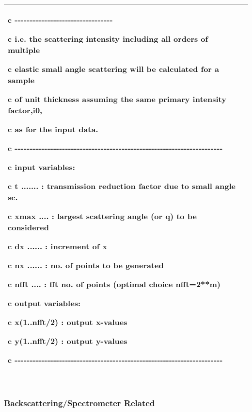 \documentclass[]{article}
\begin{document}
\begin{longtable}[]{@{}ll@{}}
\begin{minipage}[t]{0.47\columnwidth}
c
-\/-\/-\/-\/-\/-\/-\/-\/-\/-\/-\/-\/-\/-\/-\/-\/-\/-\/-\/-\/-\/-\/-\/-\/-\/-\/-\/-\/-\/-\/-\/-\/-

c i.e. the scattering intensity including all orders of multiple

c elastic small angle scattering will be calculated for a sample

c of unit thickness assuming the same primary intensity factor,i0,

c as for the input data.

c
-\/-\/-\/-\/-\/-\/-\/-\/-\/-\/-\/-\/-\/-\/-\/-\/-\/-\/-\/-\/-\/-\/-\/-\/-\/-\/-\/-\/-\/-\/-\/-\/-\/-\/-\/-\/-\/-\/-\/-\/-\/-\/-\/-\/-\/-\/-\/-\/-\/-\/-\/-\/-\/-\/-\/-\/-\/-\/-\/-\/-\/-\/-\/-\/-\/-\/-\/-\/-\/-

c input variables:

c t ....... : transmission reduction factor due to small angle sc.

c xmax .... : largest scattering angle (or q) to be considered

c dx ...... : increment of x

c nx ...... : no. of points to be generated

c nfft .... : fft no. of points (optimal choice nfft=2**m)

c output variables:

c x(1..nfft/2) : output x-values

c y(1..nfft/2) : output y-values

c
-\/-\/-\/-\/-\/-\/-\/-\/-\/-\/-\/-\/-\/-\/-\/-\/-\/-\/-\/-\/-\/-\/-\/-\/-\/-\/-\/-\/-\/-\/-\/-\/-\/-\/-\/-\/-\/-\/-\/-\/-\/-\/-\/-\/-\/-\/-\/-\/-\/-\/-\/-\/-\/-\/-\/-\/-\/-\/-\/-\/-\/-\/-\/-\/-\/-\/-\/-\/-\/-\strut
\end{minipage}\tabularnewline
\bottomrule
\end{longtable}

\hypertarget{section-5}{%
\subsubsection{}\label{section-5}}

\hypertarget{section-6}{%
\subsubsection{}\label{section-6}}

\hypertarget{backscatteringspectrometer-related}{%
\subsubsection{\texorpdfstring{\\
Backscattering/Spectrometer
Related}{ Backscattering/Spectrometer Related}}\label{backscatteringspectrometer-related}}
\end{document}
